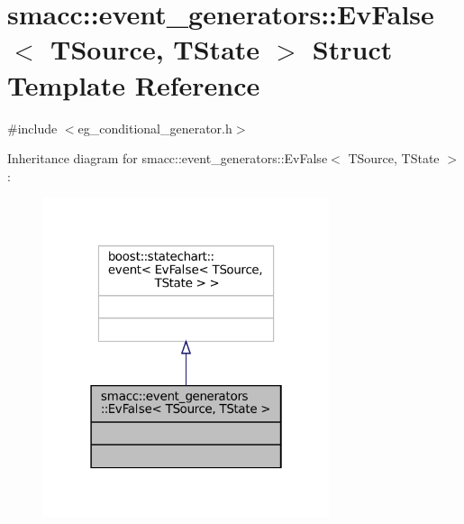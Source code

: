 \hypertarget{structsmacc_1_1event__generators_1_1EvFalse}{}\section{smacc\+:\+:event\+\_\+generators\+:\+:Ev\+False$<$ T\+Source, T\+State $>$ Struct Template Reference}
\label{structsmacc_1_1event__generators_1_1EvFalse}


{\ttfamily \#include $<$eg\+\_\+conditional\+\_\+generator.\+h$>$}



Inheritance diagram for smacc\+:\+:event\+\_\+generators\+:\+:Ev\+False$<$ T\+Source, T\+State $>$\+:
\nopagebreak
\begin{figure}[H]
\begin{center}
\leavevmode
\includegraphics[width=238pt]{structsmacc_1_1event__generators_1_1EvFalse__inherit__graph}
\end{center}
\end{figure}


